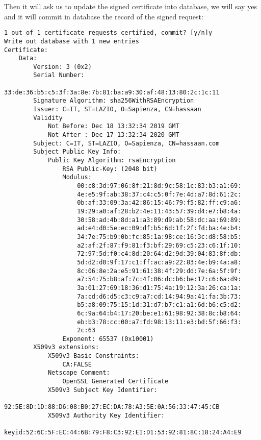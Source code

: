 \documentclass[11pt]{article}
\begin{document}
Then it will ask us to update the signed certificate into database, we will say yes and it will commit in database the record of the signed request:

\begin{verbatim}
1 out of 1 certificate requests certified, commit? [y/n]y
Write out database with 1 new entries
Certificate:
    Data:
        Version: 3 (0x2)
        Serial Number:
            33:de:36:b5:c5:3f:3a:8e:7b:81:ba:a9:30:af:48:13:80:2c:1c:11
        Signature Algorithm: sha256WithRSAEncryption
        Issuer: C=IT, ST=LAZIO, O=Sapienza, CN=hassaan
        Validity
            Not Before: Dec 18 13:32:34 2019 GMT
            Not After : Dec 17 13:32:34 2020 GMT
        Subject: C=IT, ST=LAZIO, O=Sapienza, CN=hassaan.com
        Subject Public Key Info:
            Public Key Algorithm: rsaEncryption
                RSA Public-Key: (2048 bit)
                Modulus:
                    00:c8:3d:97:06:8f:21:8d:9c:58:1c:83:b3:a1:69:
                    4e:e5:9f:ab:38:37:c4:c5:0f:7e:4d:a7:8d:61:2c:
                    0b:af:33:09:3a:42:86:15:46:79:f5:82:ff:c9:a6:
                    19:29:a0:af:28:b2:4e:11:43:57:39:d4:e7:b8:4a:
                    30:58:ad:4b:8d:a1:a3:89:d9:ab:58:dc:aa:69:89:
                    ad:e4:d0:5e:ec:09:df:b5:6d:1f:2f:fd:ba:4e:b4:
                    34:7e:75:b9:0b:fc:85:1a:98:ce:16:3c:d8:58:b5:
                    a2:af:2f:87:f9:81:f3:bf:29:69:c5:23:c6:1f:10:
                    72:97:5d:f0:c4:8d:20:64:d2:9d:39:04:83:8f:db:
                    5d:d2:d0:9f:17:c1:ff:ac:a9:22:83:4e:b9:4a:a8:
                    8c:06:8e:2a:e5:91:61:38:4f:29:dd:7e:6a:5f:9f:
                    a7:54:75:b8:af:7c:4f:06:dc:b6:be:17:c6:6a:d9:
                    3a:01:27:69:18:36:d1:75:4a:19:12:3a:26:ca:1a:
                    7a:cd:d6:d5:c3:c9:a7:cd:14:94:9a:41:fa:3b:73:
                    b5:a8:09:75:15:1d:31:d7:b7:c1:a1:6d:b6:c5:d2:
                    6c:9a:64:b4:17:20:be:e1:61:98:92:38:8c:b8:64:
                    eb:b3:78:cc:00:a7:fd:98:13:11:e3:bd:5f:66:f3:
                    2c:63
                Exponent: 65537 (0x10001)
        X509v3 extensions:
            X509v3 Basic Constraints:
                CA:FALSE
            Netscape Comment:
                OpenSSL Generated Certificate
            X509v3 Subject Key Identifier:
                92:5E:8D:1D:88:D6:08:B0:27:EC:DA:78:A3:5E:0A:56:33:47:45:CB
            X509v3 Authority Key Identifier:
                keyid:52:6C:5F:EC:44:6B:79:F8:C3:92:E1:D1:53:92:81:8C:18:24:A4:E9


\end{verbatim}
\end{document}
